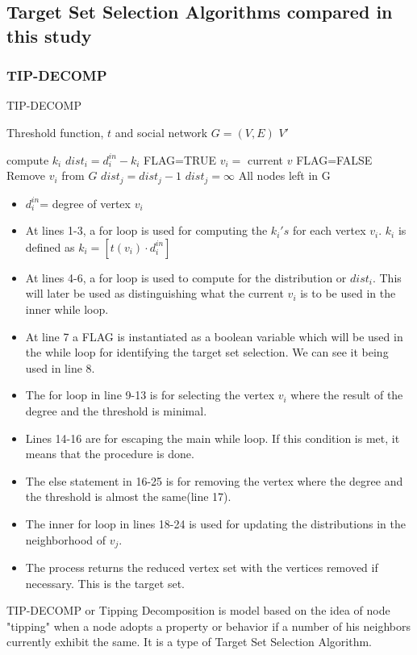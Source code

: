 \subsection{Target Set Selection Algorithms compared in this study}
\subsubsection{TIP-DECOMP}
\begin{algorithm}
	\caption{TIP-DECOMP}
	\begin{algorithmic}[1]
		\Require Threshold function, $t$ and social network $G=(V,E)$
		\Ensure $V'$
		
			\State compute $k_{i}$ 
		\EndFor
			\State $dist_{i}=d_{i}^{in}-k_{i} $
		\EndFor
		\State FLAG=TRUE 
					\State $v_{i}=$ current $v$
				\EndIf
			\EndFor
				\State FLAG=FALSE 
			\Else
			\State Remove $v_{i}$ from $G$ 
						\State $dist_{j}=dist_{j}-1$
					\Else
						\State$dist_{j}=\infty$  
					\EndIf
				\EndFor
			\EndIf
		\EndWhile
		\State \Return All nodes left in G 
	\end{algorithmic}
\end{algorithm}

\begin{itemize}
	\item $d_{i}^{in}$= degree of vertex $v_{i}$
	\item At lines 1-3, a for loop is used for computing the $k_{i}'s$ for each vertex $v_{i}$. $k_{i}$ is defined as  $k_{i}=[t(v_{i})\cdot d_{i}^{in}]$
	\item At lines 4-6, a for loop is used to compute for the distribution or $dist_{i}$. This will later be used as distinguishing what the current $v_{i}$ is to be used in the inner while loop.
	\item At line 7 a FLAG is instantiated as a boolean variable which will be used in the while loop for identifying the target set selection. We can see it being used in line 8.
	\item The for loop in line 9-13 is for selecting the vertex $v_{i}$ where the result of the degree and the threshold is minimal.
	\item Lines 14-16 are for escaping the main while loop. If this condition is met, it means that the procedure is done.
	\item The else statement in 16-25 is for removing the vertex where the degree and the threshold is almost the same(line 17).
	\item The inner for loop in lines 18-24 is used for updating the distributions in the neighborhood of $v_{j}$.
	\item The process returns the reduced vertex set with the vertices removed if necessary. This is the target set.
\end{itemize}
TIP-DECOMP or Tipping Decomposition is model based on the idea of node "tipping" when a node adopts a property or behavior if a number of his neighbors currently exhibit the same. It is a type of Target Set Selection Algorithm. 

